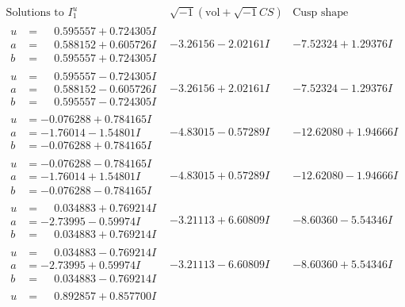 \documentclass[1p]{elsarticle_modified}
\theoremstyle{definition}
\newcommand{\I}{\sqrt{-1}}
\begin{document}
$$\begin{array}{c|c|c}  
\text{Solutions to }I^u_{1}& \I (\text{vol} + \sqrt{-1}CS) & \text{Cusp shape}\\
 \hline 
\begin{aligned}
u &= \phantom{-}0.595557 + 0.724305 I \\
a &= \phantom{-}0.588152 + 0.605726 I \\
b &= \phantom{-}0.595557 + 0.724305 I\end{aligned}
 & -3.26156 - 2.02161 I & -7.52324 + 1.29376 I \\ \hline\begin{aligned}
u &= \phantom{-}0.595557 - 0.724305 I \\
a &= \phantom{-}0.588152 - 0.605726 I \\
b &= \phantom{-}0.595557 - 0.724305 I\end{aligned}
 & -3.26156 + 2.02161 I & -7.52324 - 1.29376 I \\ \hline\begin{aligned}
u &= -0.076288 + 0.784165 I \\
a &= -1.76014 - 1.54801 I \\
b &= -0.076288 + 0.784165 I\end{aligned}
 & -4.83015 - 0.57289 I & -12.62080 + 1.94666 I \\ \hline\begin{aligned}
u &= -0.076288 - 0.784165 I \\
a &= -1.76014 + 1.54801 I \\
b &= -0.076288 - 0.784165 I\end{aligned}
 & -4.83015 + 0.57289 I & -12.62080 - 1.94666 I \\ \hline\begin{aligned}
u &= \phantom{-}0.034883 + 0.769214 I \\
a &= -2.73995 - 0.59974 I \\
b &= \phantom{-}0.034883 + 0.769214 I\end{aligned}
 & -3.21113 + 6.60809 I & -8.60360 - 5.54346 I \\ \hline\begin{aligned}
u &= \phantom{-}0.034883 - 0.769214 I \\
a &= -2.73995 + 0.59974 I \\
b &= \phantom{-}0.034883 - 0.769214 I\end{aligned}
 & -3.21113 - 6.60809 I & -8.60360 + 5.54346 I \\ \hline\begin{aligned}
u &= \phantom{-}0.892857 + 0.857700 I \\

\end{aligned}
\end{array}$$
\end{document}
